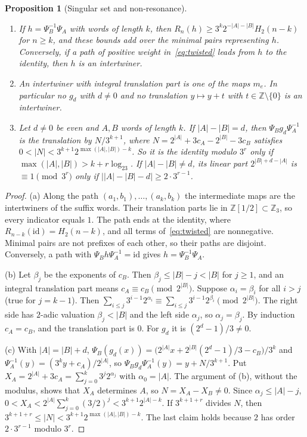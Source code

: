 \documentclass[11pt]{article}
\newtheorem{proposition}[theorem]{Proposition}
\theoremstyle{remark}
\newcommand{\Z}{\mathbb Z}
\begin{document}
\begin{proposition}[Singular set and non-resonance]\label{prop:intertwiners}
\leavevmode\begin{enumerate}
\item[(a)] If $h=\Psi_B^{-1}\Psi_A$ with words of length $k$, then $R_n(h)\ge3^k2^{-|A|-|B|}H_2(n-k)$ for $n\ge k$, and these bounds add over the minimal pairs representing $h$. Conversely, if a path of positive weight in~\eqref{eq:twisted} leads from $h$ to the identity, then $h$ is an intertwiner.
\item[(b)] An intertwiner with integral translation part is one of the maps $m_e$. In particular no $g_d$ with $d\ne0$ and no translation $y\mapsto y+t$ with $t\in\Z\setminus\{0\}$ is an intertwiner.
\item[(c)] Let $d\ne0$ be even and $A,B$ words of length $k$. If $|A|-|B|=d$, then $\Psi_Bg_d\Psi_A^{-1}$ is the translation by $N/3^{k+1}$, where $N=2^{|A|}+3c_A-2^{|B|}-3c_B$ satisfies $0<|N|<3^{k+1}2^{\max(|A|,|B|)-k}$. So it is the identity modulo $3^r$ only if $\max(|A|,|B|)>k+r\log_23$. If $|A|-|B|\ne d$, its linear part $2^{|B|+d-|A|}$ is $\equiv1\pmod{3^r}$ only if $\bigl||A|-|B|-d\bigr|\ge2\cdot3^{r-1}$.
\end{enumerate}
\end{proposition}

\begin{proof}
(a) Along the path $(a_1,b_1),\dots,(a_k,b_k)$ the intermediate maps are the intertwiners of the suffix words. Their translation parts lie in $\Z[1/2]\subset\Z_3$, so every indicator equals $1$. The path ends at the identity, where $R_{n-k}(\mathrm{id})=H_2(n-k)$, and all terms of~\eqref{eq:twisted} are nonnegative. Minimal pairs are not prefixes of each other, so their paths are disjoint. Conversely, a path with $\Psi_Bh\Psi_A^{-1}=\mathrm{id}$ gives $h=\Psi_B^{-1}\Psi_A$.

(b) Let $\beta_j$ be the exponents of $c_B$. Then $\beta_j\le|B|-j<|B|$ for $j\ge1$, and an integral translation part means $c_A\equiv c_B\pmod{2^{|B|}}$. Suppose $\alpha_i=\beta_i$ for all $i>j$ (true for $j=k-1$). Then $\sum_{i\le j}3^{i-1}2^{\alpha_i}\equiv\sum_{i\le j}3^{i-1}2^{\beta_i}\pmod{2^{|B|}}$. The right side has $2$-adic valuation $\beta_j<|B|$ and the left side $\alpha_j$, so $\alpha_j=\beta_j$. By induction $c_A=c_B$, and the translation part is $0$. For $g_d$ it is $(2^d-1)/3\ne0$.

(c) With $|A|=|B|+d$, $\Psi_B(g_d(x))=\bigl(2^{|A|}x+2^{|B|}(2^d-1)/3-c_B\bigr)/3^k$ and $\Psi_A^{-1}(y)=(3^ky+c_A)/2^{|A|}$, so $\Psi_Bg_d\Psi_A^{-1}(y)=y+N/3^{k+1}$. Put $X_A=2^{|A|}+3c_A=\sum_{j=0}^k3^j2^{\alpha_j}$ with $\alpha_0=|A|$. The argument of (b), without the modulus, shows that $X_A$ determines $A$, so $N=X_A-X_B\ne0$. Since $\alpha_j\le|A|-j$, $0<X_A<2^{|A|}\sum_{j=0}^k(3/2)^j<3^{k+1}2^{|A|-k}$. If $3^{k+1+r}$ divides $N$, then $3^{k+1+r}\le|N|<3^{k+1}2^{\max(|A|,|B|)-k}$. The last claim holds because $2$ has order $2\cdot3^{r-1}$ modulo $3^r$.
\end{proof}
\end{document}
